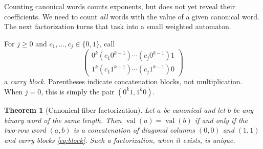 \documentclass[11pt,letterpaper]{article}
\numberwithin{equation}{section}
\newtheorem{theorem}{Theorem}[section]
\theoremstyle{definition}
\theoremstyle{remark}
\newcommand{\val}{\operatorname{val}}
\begin{document}
Counting canonical words counts exponents, but does not yet reveal their
coefficients. We need to count \emph{all} words with the value of a given
canonical word. The next factorization turns that task into a small
weighted automaton.

For $j\ge0$ and $c_1,\ldots,c_j\in\{0,1\}$, call
\begin{equation}
 \begin{pmatrix}
 0^k(c_1 0^{k-1})\cdots(c_j0^{k-1})1\\
 1^k(c_1 1^{k-1})\cdots(c_j1^{k-1})0
 \end{pmatrix}
 \label{eq:block}
\end{equation}
a \emph{carry block}. Parentheses indicate concatenation blocks, not
multiplication. When $j=0$, this is simply the pair $(0^k1,1^k0)$.

\begin{theorem}[Canonical-fiber factorization]
\label{thm:factor}
Let $a$ be canonical and let $b$ be any binary word of the same length.
Then $\val(a)=\val(b)$ if and only if the two-row word $(a,b)$ is a
concatenation of diagonal columns $(0,0)$ and $(1,1)$ and carry blocks
\eqref{eq:block}. Such a factorization, when it exists, is unique.
\end{theorem}
\end{document}
